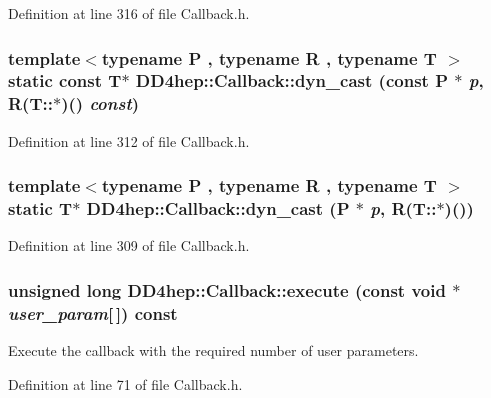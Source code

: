 Definition at line 316 of file Callback.h.\hypertarget{class_d_d4hep_1_1_callback_a4497e9974d33b6c7263108bcf81b7b27}{
\subsubsection[{dyn\_\-cast}]{\setlength{\rightskip}{0pt plus 5cm}template$<$typename P , typename R , typename T $>$ static const {\bf T}$\ast$ DD4hep::Callback::dyn\_\-cast (const P $\ast$ {\em p}, \/  R(T::$\ast$)() {\em const})}}
\label{class_d_d4hep_1_1_callback_a4497e9974d33b6c7263108bcf81b7b27}


Definition at line 312 of file Callback.h.\hypertarget{class_d_d4hep_1_1_callback_a61b19a8cda5da3a772b6dde5eaae4b85}{
\subsubsection[{dyn\_\-cast}]{\setlength{\rightskip}{0pt plus 5cm}template$<$typename P , typename R , typename T $>$ static {\bf T}$\ast$ DD4hep::Callback::dyn\_\-cast (P $\ast$ {\em p}, \/  R(T::$\ast$)())}}
\label{class_d_d4hep_1_1_callback_a61b19a8cda5da3a772b6dde5eaae4b85}


Definition at line 309 of file Callback.h.\hypertarget{class_d_d4hep_1_1_callback_aa2f121c71eaba5c384fe57aade6ebda9}{
\subsubsection[{execute}]{\setlength{\rightskip}{0pt plus 5cm}unsigned long DD4hep::Callback::execute (const void $\ast$ {\em user\_\-param}\mbox{[}$\,$\mbox{]}) const}}
\label{class_d_d4hep_1_1_callback_aa2f121c71eaba5c384fe57aade6ebda9}


Execute the callback with the required number of user parameters. 

Definition at line 71 of file Callback.h.

